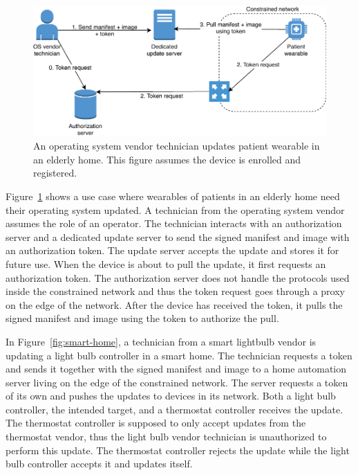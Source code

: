 \documentclass[0-thesis.tex]{subfiles}
\begin{document}
\begin{figure}[t]
    \caption[An operating system vendor technician updates patient wearable in an elderly home.]
        {An operating system vendor technician updates patient wearable in an elderly home. This figure assumes the device is enrolled and registered.}
    \label{fig:elderly-home}
    \includegraphics{images/use-case-elderly-home.pdf}
\end{figure}

Figure~\ref{fig:elderly-home} shows a use case where wearables of patients in an elderly
home need their operating system updated. A technician from the operating system vendor
assumes the role of an operator. The technician interacts with an authorization server and
a dedicated update server to send the signed manifest and image with an authorization
token. The update server accepts the update and stores it for future use. When the device
is about to pull the update, it first requests an authorization token. The authorization
server does not handle the protocols used inside the constrained network and thus the
token request goes through a proxy on the edge of the network. After the device has
received the token, it pulls the signed manifest and image using the token to authorize
the pull.

In Figure~\ref{fig:smart-home}, a technician from a smart lightbulb vendor is updating a
light bulb controller in a smart home. The technician requests a token and sends it
together with the signed manifest and image to a home automation server living on the edge
of the constrained network. The server requests a token of its own and pushes the updates
to devices in its network. Both a light bulb controller, the intended target, and a
thermostat controller receives the update. The thermostat controller is supposed to only
accept updates from the thermostat vendor, thus the light bulb vendor technician is
unauthorized to perform this update. The thermostat controller rejects the update while
the light bulb controller accepts it and updates itself.
\end{document}
